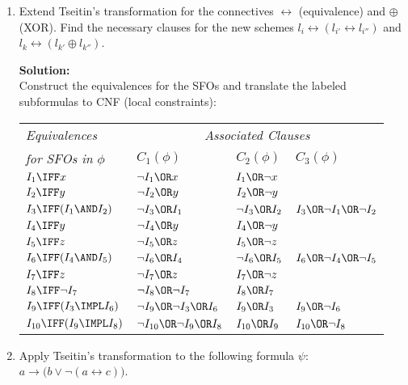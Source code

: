 \documentclass[11pt,a4paper]{uebung}
\newcommand{\solution}[1]{\par {\bf Solution:}\\#1}
\begin{document}
\begin{enumerate}
\item Extend Tseitin's transformation for the connectives $\leftrightarrow$
  (equivalence) and $\oplus$ (XOR). Find the necessary clauses for the new schemes
  $l_i \leftrightarrow (l_{i'} \leftrightarrow l_{i''})$ and $l_k
  \leftrightarrow (l_{k'} \oplus l_{k''})$.
  
  \solution{
Construct the equivalences for the SFOs and translate the labeled
subformulas to CNF (local constraints):

\begin{tabular}{|l|l|l|l|}
\hline
\textsl{\small Equivalences} & \multicolumn{3}{c|}{\textsl{\small Associated
Clauses}} \\ 
{\small \textsl{for SFOs in} $\phi $} & $C_{1}(\phi )$ & $C_{2}(\phi )$ & $%
C_{3}(\phi )$ \\ \hline
$I_{1}\IFF x$ & $\lnot I_{1}\OR x$ & $I_{1}\OR\lnot x$ &  \\ 
$I_{2}\IFF y$ & $\lnot I_{2}\OR y$ & $I_{2}\OR\lnot y$ &  \\ 
$I_{3}\IFF(I_{1}\AND I_{2})$ & $\lnot I_{3}\OR I_{1}$ & $\lnot I_{3}\OR %
I_{2} $ & $I_{3}\OR\lnot I_{1}\OR\lnot I_{2}$ \\ 
$I_{4}\IFF y$ & $\lnot I_{4}\OR y$ & $I_{4}\OR\lnot y$ &  \\ 
$I_{5}\IFF z$ & $\lnot I_{5}\OR z$ & $I_{5}\OR\lnot z$ &  \\ 
$I_{6}\IFF(I_{4}\AND I_{5})$ & $\lnot I_{6}\OR I_{4}$ & $\lnot I_{6}\OR %
I_{5} $ & $I_{6}\OR\lnot I_{4}\OR\lnot I_{5}$ \\ 
$I_{7}\IFF z$ & $\lnot I_{7}\OR z$ & $I_{7}\OR\lnot z$ &  \\ 
$I_{8}\IFF\lnot I_{7}$ & $\lnot I_{8}\OR\lnot I_{7}$ & $I_{8}\OR I_{7}$ & 
\\ 
$I_{9}\IFF(I_{3}\IMPL I_{6})$ & $\lnot I_{9}\OR\lnot I_{3}\OR I_{6}$ & $I_{9}%
\OR I_{3}$ & $I_{9}\OR\lnot I_{6}$ \\ 
$I_{10}\IFF(I_{9}\IMPL I_{8})$ & $\lnot I_{10}\OR\lnot I_{9}\OR I_{8}$ & $%
I_{10}\OR I_{9}$ & $I_{10}\OR\lnot I_{8}$ \\ \hline
\end{tabular}
\label{tab:translation_cnf}

  }

\item Apply Tseitin's transformation to the following formula $\psi$: $a \rightarrow
  \big( b \lor \neg (a \leftrightarrow c)\big)$.
  

\end{enumerate}
\end{document}
